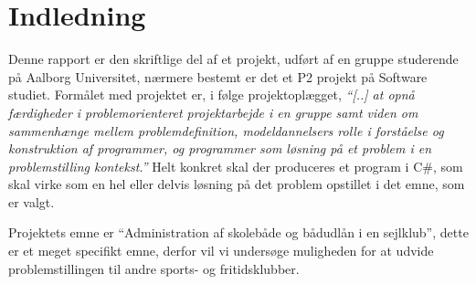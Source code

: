 \chapter{Indledning}\label{chap:indledning}



Denne rapport er den skriftlige del af et projekt, udført af en gruppe studerende på Aalborg Universitet, nærmere bestemt er det et P2 projekt på Software studiet. Formålet med projektet er, i følge projektoplægget, \textit{``[..] at opnå færdigheder i problemorienteret projektarbejde i en gruppe samt viden om sammenhænge mellem problemdefinition, modeldannelsers rolle i forståelse og konstruktion af programmer, og programmer som løsning på et problem i en problemstilling kontekst.''} Helt konkret skal der produceres et program i C\#, som skal virke som en hel eller delvis løsning på det problem opstillet i det emne, som er valgt. 

Projektets emne er ``Administration af skolebåde og bådudlån i en sejlklub'', dette er et meget specifikt emne, derfor vil vi undersøge muligheden for at udvide problemstillingen til andre sports- og fritidsklubber. 

